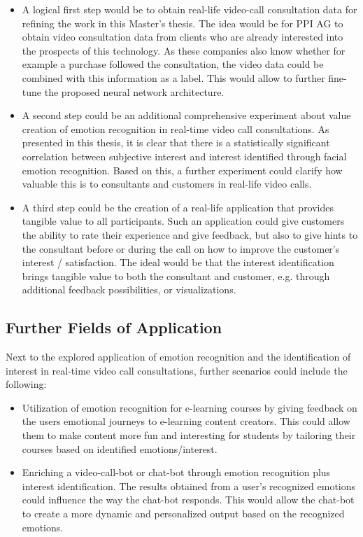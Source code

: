 \begin{itemize}
    \item A logical first step would be to obtain real-life video-call consultation data for refining the work in this Master's thesis. The idea would be for PPI AG to obtain video consultation data from clients who are already interested into the prospects of this technology. As these companies also know whether for example a purchase followed the consultation, the video data could be combined with this information as a label. This would allow to further fine-tune the proposed neural network architecture.
    \item A second step could be an additional comprehensive experiment about value creation of emotion recognition in real-time video call consultations. As presented in this thesis, it is clear that there is a statistically significant correlation between subjective interest and interest identified through facial emotion recognition. Based on this, a further experiment could clarify how valuable this is to consultants and customers in real-life video calls.
    \item A third step could be the creation of a real-life application that provides tangible value to all participants. Such an application could give customers the ability to rate their experience and give feedback, but also to give hints to the consultant before or during the call on how to improve the customer's interest / satisfaction. The ideal would be that the interest identification brings tangible value to both the consultant and customer, e.g. through additional feedback possibilities, or visualizations.
\end{itemize}

\subsection{Further Fields of Application}
Next to the explored application of emotion recognition and the identification of interest in real-time video call consultations, further scenarios could include the following:\newline
\begin{itemize}
    \item Utilization of emotion recognition for e-learning courses by giving feedback on the users emotional journeys to e-learning content creators. This could allow them to make content more fun and interesting for students by tailoring their courses based on identified emotions/interest.
    \item Enriching a video-call-bot or chat-bot through emotion recognition plus interest identification. The results obtained from a user's recognized emotions could influence the way the chat-bot responds. This would allow the chat-bot to create a more dynamic and personalized output based on the recognized emotions.
\end{itemize}


